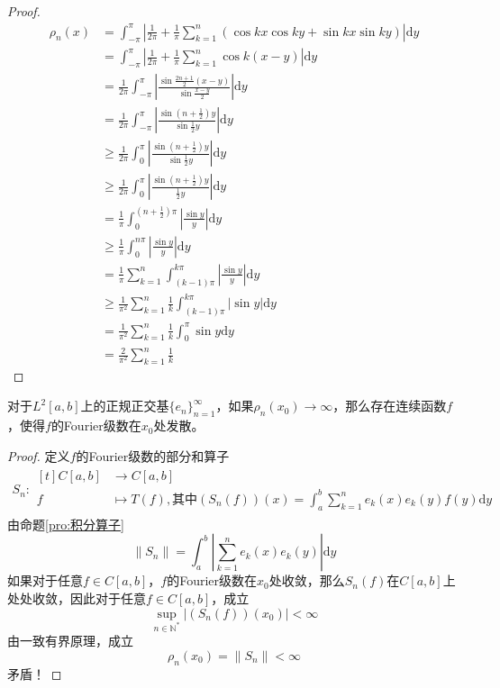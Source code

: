 \documentclass[lang = cn, scheme = chinese, thmcnt = section]{elegantbook}
\newcommand{\N}{\mathbb{N}}            %
\begin{document}
\begin{proof}
	\begin{align*}
		\rho_n(x)
		& = \int_{-\pi}^{\pi}\left| \frac{1}{2\pi}+\frac{1}{\pi}\sum_{k=1}^{n}(\cos kx\cos ky+\sin kx\sin ky) \right|\mathrm{d}y\\
		& = \int_{-\pi}^{\pi}\left| \frac{1}{2\pi}+\frac{1}{\pi}\sum_{k=1}^{n}\cos k(x-y) \right|\mathrm{d}y\\
		& = \frac{1}{2\pi}\int_{-\pi}^{\pi}\left| \frac{\sin\frac{2n+1}{2}(x-y)}{\sin\frac{x-y}{2}} \right|\mathrm{d}y\\
		& = \frac{1}{2\pi}\int_{-\pi}^{\pi}\left| \frac{\sin\left(n+\frac{1}{2}\right)y}{\sin\frac{1}{2}y} \right|\mathrm{d}y\\
		& \ge \frac{1}{2\pi}\int_{0}^{\pi}\left| \frac{\sin\left(n+\frac{1}{2}\right)y}{\sin\frac{1}{2}y} \right|\mathrm{d}y\\
		& \ge \frac{1}{2\pi}\int_{0}^{\pi}\left| \frac{\sin\left(n+\frac{1}{2}\right)y}{\frac{1}{2}y} \right|\mathrm{d}y\\
		& = \frac{1}{\pi}\int_{0}^{\left(n+\frac{1}{2}\right)\pi}\left| \frac{\sin y}{y} \right|\mathrm{d}y\\
		& \ge \frac{1}{\pi}\int_{0}^{n\pi}\left| \frac{\sin y}{y} \right|\mathrm{d}y\\
		& = \frac{1}{\pi}\sum_{k=1}^{n}\int_{(k-1)\pi}^{k\pi}\left| \frac{\sin y}{y} \right|\mathrm{d}y\\
		& \ge \frac{1}{\pi^2}\sum_{k=1}^{n}\frac{1}{k}\int_{(k-1)\pi}^{k\pi}|\sin y|\mathrm{d}y\\
		& = \frac{1}{\pi^2}\sum_{k=1}^{n}\frac{1}{k}\int_{0}^{\pi}\sin y\mathrm{d}y\\
		& = \frac{2}{\pi^2}\sum_{k=1}^{n}\frac{1}{k}
	\end{align*}
\end{proof}

\begin{proposition}
	对于$L^2[a,b]$上的正规正交基$\{e_n\}_{n=1}^{\infty}$，如果$\rho_n(x_0)\to \infty$，那么存在连续函数$f$，使得$f$的Fourier级数在$x_0$处发散。
\end{proposition}

\begin{proof}
	定义$f$的Fourier级数的部分和算子
	\begin{align*}
		S_n:\begin{aligned}[t]
			C[a,b]&\longrightarrow C[a,b]\\
			f&\longmapsto T(f), \text{其中} (S_n(f))(x)=\int_a^b\sum_{k=1}^{n}e_k(x)e_k(y)f(y)\mathrm{d}y 
		\end{aligned}
	\end{align*}
	由命题\ref{pro:积分算子}
	$$
	\|S_n\|=\int_a^b\left| \sum_{k=1}^{n}e_k(x)e_k(y) \right|\mathrm{d}y
	$$
	如果对于任意$f\in C[a,b]$，$f$的Fourier级数在$x_0$处收敛，那么$S_n(f)$在$C[a,b]$上处处收敛，因此对于任意$f\in C[a,b]$，成立
	$$
	\sup_{n\in\N^*}|(S_n(f))(x_0)|<\infty
	$$
	由一致有界原理，成立
	$$
	\rho_n(x_0)=\|S_n\|<\infty
	$$
	矛盾！
\end{proof}
\end{document}
